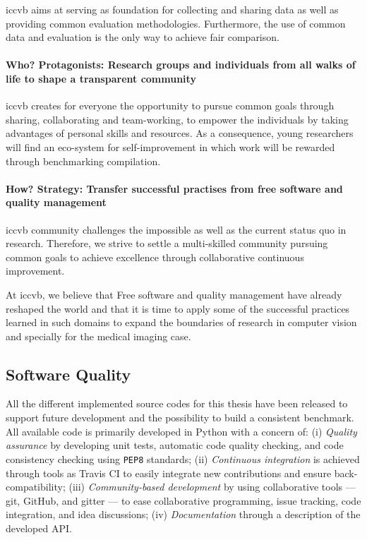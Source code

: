 \Ac{iccvb} aims at serving as foundation for collecting and sharing data as well as providing common evaluation methodologies.
Furthermore, the use of common data and evaluation is the only way to achieve fair comparison.

\paragraph{Who? Protagonists: Research groups and individuals from all walks of life to shape a transparent community}
\Ac{iccvb} creates for everyone the opportunity to pursue common goals through sharing, collaborating and team-working, to empower the individuals by taking advantages of personal skills and resources.
As a consequence, young researchers will find an eco-system for self-improvement in which work will be rewarded through benchmarking compilation.

\paragraph{How? Strategy: Transfer successful practises from free software and quality management}
\Ac{iccvb} community challenges the impossible as well as the current status quo in research.
Therefore, we strive to settle a multi-skilled community pursuing common goals to achieve excellence through collaborative continuous improvement.

At \ac{iccvb}, we believe that Free software and quality management have already reshaped the world and that it is time to apply some of the successful practices learned in such domains to expand the boundaries of research in computer vision and specially for the medical imaging case.

\subsection{Software Quality}

All the different implemented source codes for this thesis have been released to support future development and the possibility to build a consistent benchmark.
All available code is primarily developed in Python with a concern of:
(i) \emph{Quality assurance} by developing unit tests, automatic code quality checking, and code consistency checking using \texttt{PEP8} standards;
(ii) \emph{Continuous integration} is achieved through tools as Travis CI to easily integrate new contributions and ensure back-compatibility;
(iii) \emph{Community-based development} by using collaborative tools --- git, GitHub, and gitter --- to ease collaborative programming, issue tracking, code integration, and idea discussions;
(iv) \emph{Documentation} through a description of the developed API.

